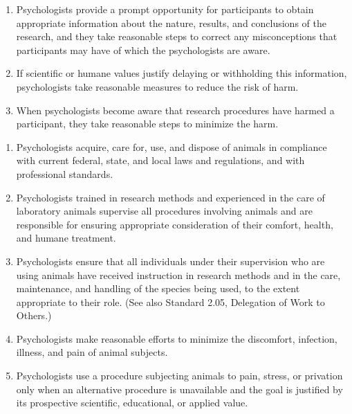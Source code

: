 \begin{fullwidth}
\begin{enumerate}
\item Psychologists provide a prompt opportunity for participants to obtain appropriate information about the nature, results, and conclusions of the research, and they take reasonable steps to correct any misconceptions that participants may have of which the psychologists are aware.

\item If scientific or humane values justify delaying or withholding this information, psychologists take reasonable measures to reduce the risk of harm.

\item When psychologists become aware that research procedures have harmed a participant, they take reasonable steps to minimize the harm.

\end{enumerate}



\begin{enumerate}

\item Psychologists acquire, care for, use, and dispose of animals in compliance with current federal, state, and local laws and regulations, and with professional standards.


\item Psychologists trained in research methods and experienced in the care of laboratory animals supervise all procedures involving animals and are responsible for ensuring appropriate consideration of their comfort, health, and humane treatment.


\item Psychologists ensure that all individuals under their supervision who are using animals have received instruction in research methods and in the care, maintenance, and handling of the species being used, to the extent appropriate to their role. (See also Standard 2.05, Delegation of Work to Others.)


\item Psychologists make reasonable efforts to minimize the discomfort, infection, illness, and pain of animal subjects.


\item Psychologists use a procedure subjecting animals to pain, stress, or privation only when an alternative procedure is unavailable and the goal is justified by its prospective scientific, educational, or applied value.



\end{enumerate}
\end{fullwidth}

